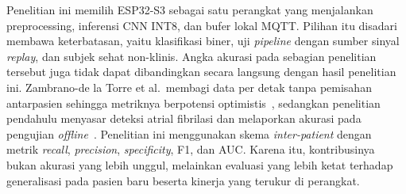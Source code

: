 Penelitian ini memilih ESP32-S3 sebagai satu perangkat yang menjalankan preprocessing, inferensi CNN INT8, dan bufer lokal MQTT. Pilihan itu disadari membawa keterbatasan, yaitu klasifikasi biner, uji \textit{pipeline} dengan sumber sinyal \textit{replay}, dan subjek sehat non-klinis. Angka akurasi pada sebagian penelitian tersebut juga tidak dapat dibandingkan secara langsung dengan hasil penelitian ini. Zambrano-de la Torre et al.\ membagi data per detak tanpa pemisahan antarpasien sehingga metriknya berpotensi optimistis~\cite{zambrano_2026, xiao_2023}, sedangkan penelitian pendahulu menyasar deteksi atrial fibrilasi dan melaporkan akurasi pada pengujian \textit{offline}~\cite{mulyawan_2026}. Penelitian ini menggunakan skema \textit{inter-patient} dengan metrik \textit{recall}, \textit{precision}, \textit{specificity}, F1, dan AUC. Karena itu, kontribusinya bukan akurasi yang lebih unggul, melainkan evaluasi yang lebih ketat terhadap generalisasi pada pasien baru beserta kinerja yang terukur di perangkat.
